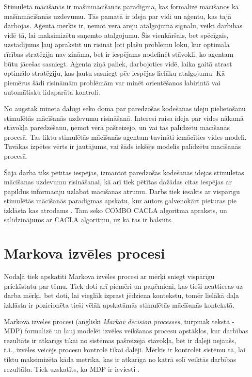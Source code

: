 \documentclass{ludis} %
\begin{document}
Stimulētā mācīšanās ir mašīnmācīšanās paradigma, kas formalizē mācīšanos kā
mašīnmācīšanās uzdevumu. Tās pamatā ir ideja par vidi un aģentu, kas tajā
darbojas. Aģenta mērķis ir, ņemot vērā ārēju atalgojuma signālu, veikt darbības
vidē tā, lai maksimizētu saņemto atalgojumu. Šis vienkāršais, bet spēcīgais,
uzstādījums ļauj aprakstīt un risināt ļoti plašu problēmu loku, kur optimālā
rīcības stratēģija nav zināma, bet ir iespējams nodefinēt stāvokli, ko aģentam
būtu jācešas sasniegt. Aģenta ziņā paliek, darbojoties vidē, laika gaitā atrast
optimālo stratēģiju, kas ļautu sasniegt pēc iespējas lielāku atalgojumu. Kā
piemērus šādi risināmām problēmām var minēt orientēšanos labirintā vai
automātisku lidaparāta kontroli.

No augstāk minētā dabīgi seko doma par paredzošās kodēšanas ideju pielietošanu
stimulētās mācīšanās uzdevumu risināšanā. Interesi raisa ideja par vides nākamā
stāvokļa paredzēšanu, ņēmot vērā pašreizējo, un vai tas palīdzētu mācīšanās
procesā. Tas liktu stimulētās mācīšanās aģentam tuvināti iemācīties vides
modeli. Tuvākas izpētes vērts ir jautājums, vai šāds iekšējs modelis palīdzētu
macīšanās procesā.

Šajā darbā tiks pētītas iespējas, izmantot paredzošās kodēšanas idejas stimulētās
mācīšanas uzdevumu risināšanai, kā arī tiek pētītas dažādas citas iespējas ar
papildus informāciju uzlabot mācīšanās ātrumu. Darbs tiek iesākts ar vispārīgu stimulētās
mācīšanās paradigmas apskatu, kur autors galvenokārt pieturas pie izklāsta kas
atrodams \autocite{Krislauks2015}. Tam seko COMBO CACLA algoritma apraksts, un
salīdzinājums ar CACLA algoritmu, uz kā tas ir balstīts. %

\chapter{Markova izvēles procesi} \label{chap:mdp}
Nodaļā tiek apskatīti Markova izvēles procesi ar mērķi sniegt vispārīgu
priekšstatu par tēmu. Tiek doti arī piemēri un paņēmieni, kas tieši neattiecas
uz darba mērķi, bet doti, lai vieglāk izprast jēdziena kontekstu, tomēr lielākā
daļa izklāsta ir pozicionēta tieši vēlāk apskatāmās stimulētās mācīšanās
kontekstā.

Markova izvēles procesi (angliski \textit{Markov decision processes}, turpmāk
tekstā - MDP) formalizē un ļauj modelēt izvēles veikšanas procesu apstākļos, kur
darbības rezultāts ir atkarīgs tikai no sistēmas pašreizējā stāvokļa, bet ir
daļēji nejaušs, t.i., izvēles veicējs procesu kontrolē tikai daļēji. Mērķis ir
kontrolēt sistēmu tā, lai tiktu maksimizēta kāda metrika, kas ir atkarīga no
katrā solī veiktās darbības rezultāta. Tiek uzskatīts, ka MDP ir ieviesti
\autocite{Bel}.
\end{document}
